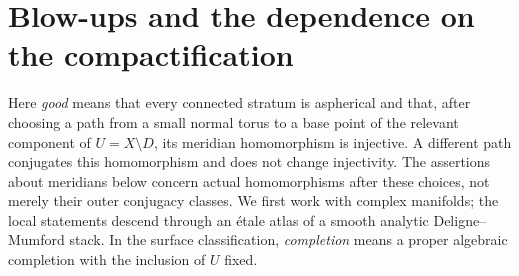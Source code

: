 \section{Blow-ups and the dependence on the compactification}
\label{sec:compactifications}

Here \emph{good} means that every connected stratum is aspherical and that,
after choosing a path from a small normal torus to a base point of the relevant
component of $U=X\setminus D$, its meridian homomorphism is injective.
A different path conjugates this homomorphism and does not change injectivity.
The assertions about meridians below concern actual homomorphisms after these
choices, not merely their outer conjugacy classes.  We first work with complex
manifolds; the local statements descend through an \'etale atlas of a smooth
analytic Deligne--Mumford stack.  In the surface classification, \emph{completion}
means a proper algebraic completion with the inclusion of $U$ fixed.

